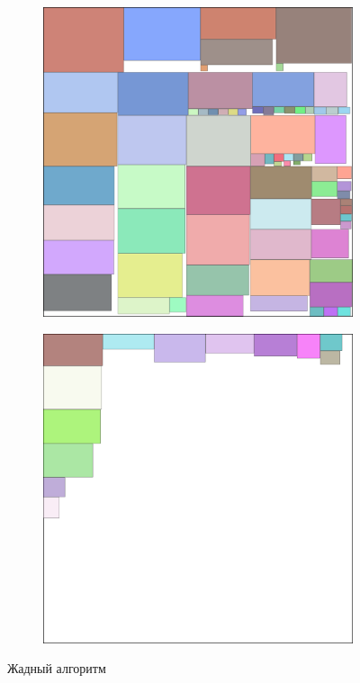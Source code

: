 \documentclass{fefu_thesis/cls/fefu}
\begin{document}
    \begin{figure}[H]
        \centering
        \begin{subfigure}{0.49\linewidth}
            \centering
            \includegraphics[scale=0.15]{images/rect_0.png}
        \end{subfigure}
        \begin{subfigure}{0.49\linewidth}
            \centering
            \includegraphics[scale=0.15]{images/rect_1.png}
        \end{subfigure}
        \caption{Жадный алгоритм}
    \end{figure}

    \newpage
    \printbibliography
\end{document}
